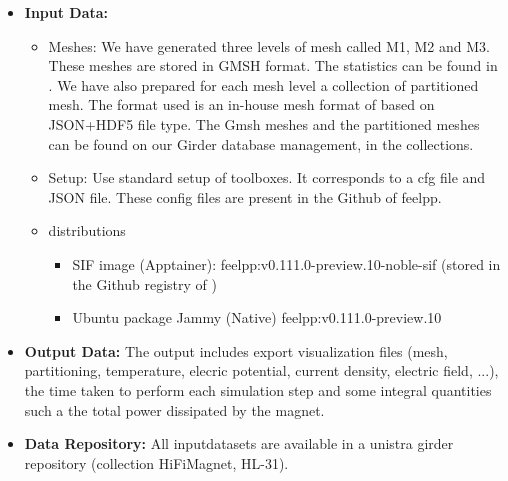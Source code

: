 \begin{itemize}
\item \textbf{Input Data:}
  \begin{itemize}
  \item Meshes: We have generated three levels of mesh called M1, M2
    and M3. These meshes are stored in GMSH format. The statistics can be found in
    . We have also prepared for
    each mesh level a collection of partitioned mesh.
    The format used is an in-house mesh format of \Feelpp based on
    JSON+HDF5 file type.
    The Gmsh meshes and the partitioned meshes can be found on our Girder
    database management, in the \Feelpp collections.
  \item Setup: Use standard setup of \Feelpp toolboxes. It corresponds to a cfg
    file and JSON file. These config files are present in the Github of feelpp.
  \item[]{\Feelpp distributions}
    \begin{itemize}
    \item SIF image (Apptainer): feelpp:v0.111.0-preview.10-noble-sif  (stored in the Github registry of \Feelpp)
    \item Ubuntu package Jammy (Native) feelpp:v0.111.0-preview.10
    \end{itemize}
  \end{itemize}
\item \textbf{Output Data:} The output includes export visualization files (mesh,
  partitioning, temperature,  elecric potential, current density, electric
  field, ...), the time taken to perform each simulation step and
  some integral quantities such a the total power dissipated by the magnet.
\item \textbf{Data Repository:} All inputdatasets are available in a unistra girder repository (collection HiFiMagnet, HL-31).
\end{itemize}



